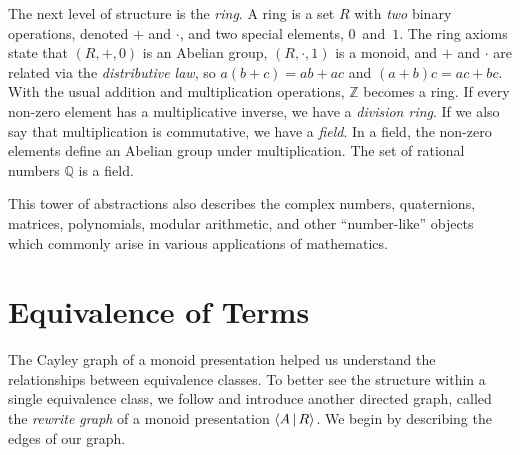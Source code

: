 \documentclass[../generics]{subfiles}
\begin{document}
The next level of structure is the \emph{ring}. A ring is a set $R$ with \emph{two} binary operations, denoted $+$ and $\cdot$, and two special elements, $0$~and~$1$. The ring axioms state that $(R,+,0)$ is an Abelian group, $(R,\cdot,1)$ is a monoid, and $+$ and $\cdot$ are related via the \emph{distributive law}, so $a(b+c)=ab+ac$ and $(a+b)c=ac+bc$. With the usual addition and multiplication operations, $\mathbb{Z}$ becomes a ring. If every non-zero element has a multiplicative inverse, we have a \emph{division ring}. If we also say that multiplication is commutative, we have a \emph{field}. In a field, the non-zero elements define an Abelian group under multiplication. The set of rational numbers $\mathbb{Q}$ is a field.

This tower of abstractions also describes the complex numbers, quaternions, matrices, polynomials, modular arithmetic, and other ``number-like'' objects which commonly arise in various applications of mathematics.

\section{Equivalence of Terms}\label{rewrite graph}

The Cayley graph of a monoid presentation helped us understand the relationships between equivalence classes. To better see the structure within a single equivalence class, we follow \cite{SQUIER1994271} and introduce another directed graph, called the \emph{rewrite graph} of a monoid presentation $\langle A\,|\,R\rangle$. We begin by describing the edges of our graph.
\end{document}
